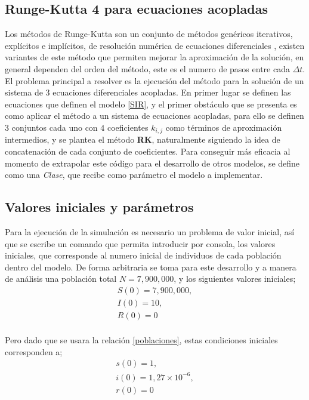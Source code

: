 \documentclass[journal]{IEEEtran}
\begin{document}
\subsection{Runge-Kutta 4 para ecuaciones acopladas}
Los métodos de Runge-Kutta son un conjunto de métodos genéricos iterativos,
explícitos e implícitos, de resolución numérica de ecuaciones diferenciales
\cite{Runge-kutta},
existen variantes de este método que permiten mejorar la aproximación de la
solución, en general dependen del orden del método, este es el numero de pasos
entre cada $\Delta t$.\\

El problema principal a resolver es la ejecución del método para la solución de
un sistema de $3$ ecuaciones
diferenciales acopladas. En primer lugar se definen las ecuaciones que definen
el modelo \ref{SIR}, y el primer
obstáculo que se presenta es como aplicar el método a un sistema de ecuaciones
acopladas, para ello se definen $3$ conjuntos
cada uno con $4$ coeficientes $k_{i, j}$ como términos de aproximación
intermedios, y se plantea el método \textbf{RK},
naturalmente siguiendo la idea de concatenación de cada conjunto de
coeficientes. Para conseguir más eficacia al momento
de extrapolar este código para el desarrollo de otros modelos, se define como
una \textit{Clase}, que recibe como parámetro
el modelo a implementar.

\subsection{Valores iniciales y parámetros}
Para la ejecución de la simulación es necesario un problema de valor inicial,
así que se escribe un comando que permita
introducir por consola, los valores iniciales, que corresponde al numero
inicial de individuos de cada población dentro del modelo. De forma arbitraria
se toma para este desarrollo y a manera de análisis una población total $N=7,900,000$, y
los siguientes valores iniciales;
\begin{equation}
  \begin{split}
    S(0) = 7,900,000,\\
    I(0) = 10,\\
    R(0) = 0\\
  \end{split}
\end{equation}

Pero dado que se usara la relación \ref{poblaciones}, estas condiciones iniciales corresponden a;
\begin{equation}
  \begin{split}
    s(0) = 1,\\
    i(0) = 1, 27 \times 10^{-6},\\
    r(0) = 0\\
  \end{split}
\end{equation}
\end{document}
